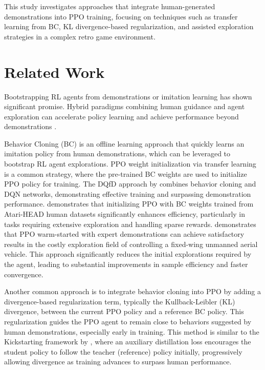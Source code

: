 \documentclass{article}
\begin{document}
This study investigates approaches that integrate human-generated 
demonstrations into PPO training, focusing on techniques such as transfer 
learning from BC, KL divergence-based regularization, and assisted exploration 
strategies in a complex retro game environment.

\section{Related Work}

Bootstrapping RL agents from demonstrations or imitation learning 
has shown significant promise. Hybrid paradigms combining human 
guidance and agent exploration can 
accelerate policy learning and achieve performance beyond 
demonstrations \cite{hester_dqfd_2017, nair_bcrl_overcoming_2018, 
song_hybrid_2023, ren_hybrid_2024, Coletti2023EffectivenessOW}.

Behavior Cloning (BC) is an offline learning approach that quickly learns 
an imitation policy from human demonstrations, which can be leveraged 
to bootstrap RL agent explorations.
PPO weight initialization via transfer learning is a common strategy,
where the pre-trained BC weights are used to 
initialize PPO policy for training. The DQfD approach by \cite{hester_dqfd_2017} 
combines behavior cloning and DQN networks, demonstrating effective 
training and surpassing demonstration performance. 
\cite{laidlaw2024bridgingrltheorypractice} demonstrates that initializing PPO 
with BC weights trained from Atari-HEAD human datasets significantly enhances 
efficiency, particularly in tasks requiring extensive exploration and 
handling sparse rewards. \cite{Coletti2023EffectivenessOW}
demonstrates that PPO warm-started with expert demonstrations can 
achieve satisfactory results in the costly exploration field of 
controlling a fixed-wing unmanned aerial vehicle. This approach 
significantly reduces the initial explorations required by 
the agent, leading to substantial improvements in sample efficiency 
and faster convergence.

Another common approach is to integrate behavior cloning into PPO by 
adding a divergence-based regularization term, typically the 
Kullback-Leibler (KL) divergence, between the current PPO policy and 
a reference BC policy. This regularization guides the PPO agent to 
remain close to behaviors suggested by human demonstrations, 
especially early in training. This method is similar to the 
Kickstarting framework by \cite{schmitt2018kickstartingdeepreinforcementlearning}, 
where an auxiliary distillation loss encourages the student policy to 
follow the teacher (reference) policy initially, progressively 
allowing divergence as training advances to surpass human performance.
\end{document}
